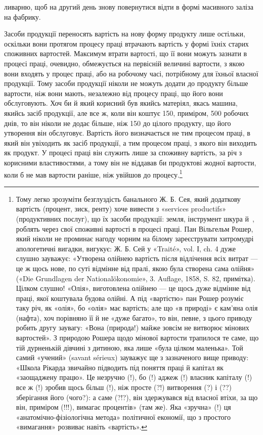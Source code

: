 \parcont{}  %
ливарню, щоб на другий день знову повернутися відти в формі
масивного заліза на фабрику.

Засоби продукції переносять вартість на нову форму продукту
лише остільки, оскільки вони протягом процесу праці втрачають
вартість у формі їхніх старих споживних вартостей. Максимум втрати вартості,
що її вони можуть зазнати в процесі праці, очевидно,
обмежується на первісній величині вартости, з якою вони
входять у процес праці, або на робочому часі, потрібному для
їхньої власної продукції. Тому засоби продукції ніколи не можуть
додати до продукту більше вартости, ніж вони мають, незалежно
від процесу праці, що його вони обслуговують. Хоч би й який
корисний був якийсь матеріял, якась машина, якийсь засіб продукції,
але все ж, коли він коштує 150, приміром,
500 робочих днів, то він ніколи не додає більше, ніж 150 до цілого продукту, що його утворення він обслуговує.
Вартість його визначається не тим процесом праці, в який
він увіходить як засіб продукції, а тим процесом праці, з якого
він виходить як продукт. У процесі праці він служить лише за
споживну вартість, за річ з корисними властивостями, а тому він
не віддавав би продуктові жодної вартости, коли б не мав вартости
раніше, ніж увійшов до процесу.\footnote{
Тому легко зрозуміти безглуздість банального Ж. Б. Сея, який додаткову
вартість (процент, зиск, ренту) хоче вивести з «services productifs»
(продуктивних послуг), що їх засоби продукції: земля, інструмент
шкура й~, роблять через свої споживні вартості в процесі праці.
Пан Вільгельм Рошер, який ніколи не проминає нагоду чорним на білому
зареєструвати хитромудрі апологетичні вигадки, вигукує: Ж. Б. Сей
у «Traité», vol. І, ch. 4 дуже слушно зауважує: «Утворена олійнею вартість
після відлічення всіх витрат — це ж щось нове, по суті відмінне від
пралі, якою була створена сама олійня» («Die Grundlagen der Nationalökonomie»,
3. Auflage, 1858, S. 82, примітка). Цілком слушно! «Олія»,
виготовлена олійнею — це щось дуже відмінне від праці, якої коштувала
будова олійні. А під «вартістю» пан Рошер розуміє таку річ, як «олія»,
бо «олія» має вартість; але що «в природі» є кам’яна олія (нафта), хоч
порівняно її й не «дуже багато», то він, певне, з цього приводу робить
другу заувагу: «Вона (природа!) майже зовсім не витворює мінових
вартостей». З природою Рошера щодо мінової вартости трапилося те саме,
що тій дурненькій дівчині з дитиною, яка лише «була цілком маленька».
Той самий «учений» (savant sérieux) зауважує ще з зазначеного вище
приводу: «Школа Рікарда звичайно підводить під поняття праці й капітал
як «заощаджену працю». Це незручно (!), бо (!) аджеж (!) власник капіталу
(!) все ж (!) зробив щось більш (!), ніж просте (?!) витворення (?)
і (??) зберігання його (чого?): а саме (?!?), він здержувався від власної
втіхи, за що він, приміром (!!!), вимагає процентів» (там же). Яка «зручна»
(!) ця «анатомічно-фізіологічна метода» політичної економії, що з
простого «вимагання» розвиває навіть «вартість».
}

